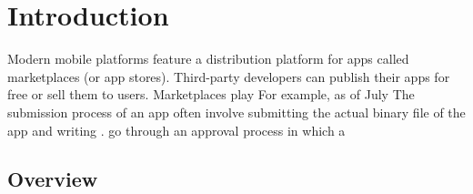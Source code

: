\chapter{Introduction}
\label{ch:intro__chapter}
Modern mobile platforms feature a distribution platform for apps called marketplaces (or app stores).
Third-party developers can publish their apps for free or sell them to users.
Marketplaces play 
For example, as of July
The submission process of an app often involve submitting the actual binary file of the app and writing . go through an approval process in which a 

\section{Overview}
